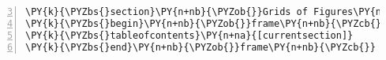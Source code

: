 \begin{Verbatim}[commandchars=\\\{\},numbers=left,numbersep=0.5em,firstnumber=3]
\PY{k}{\PYZbs{}section}\PY{n+nb}{\PYZob{}}Grids of Figures\PY{n+nb}{\PYZcb{}}
\PY{k}{\PYZbs{}begin}\PY{n+nb}{\PYZob{}}frame\PY{n+nb}{\PYZcb{}}
\PY{k}{\PYZbs{}tableofcontents}\PY{n+na}{[currentsection]}
\PY{k}{\PYZbs{}end}\PY{n+nb}{\PYZob{}}frame\PY{n+nb}{\PYZcb{}}
\end{Verbatim}
